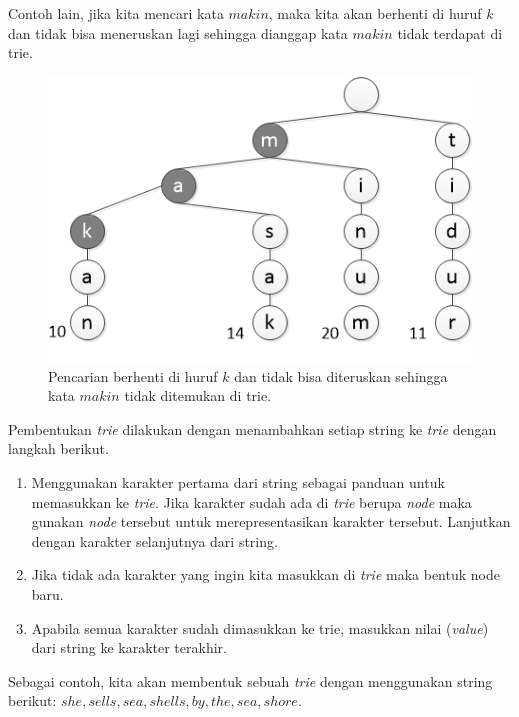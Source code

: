 Contoh lain, jika kita mencari kata $makin$, maka kita akan berhenti di huruf $k$ dan tidak bisa meneruskan lagi sehingga dianggap kata $makin$ tidak terdapat di trie.

\begin{figure}
    \includegraphics[width=\textwidth,keepaspectratio]{fig/TrieSearchingMakin.png}%
	\caption{Pencarian berhenti di huruf $k$ dan tidak bisa diteruskan sehingga kata $makin$ tidak ditemukan di trie.}%
	\label{fig:TrieSearchingMakin}%
\end{figure}

Pembentukan \textit{trie} dilakukan dengan menambahkan setiap string ke \textit{trie} dengan langkah berikut.
\begin{enumerate}
	\item Menggunakan karakter pertama dari string sebagai panduan untuk memasukkan ke \textit{trie}. Jika karakter sudah ada di \textit{trie} berupa \textit{node} maka gunakan \textit{node} tersebut untuk merepresentasikan karakter tersebut. Lanjutkan dengan karakter selanjutnya dari string.
	\item Jika tidak ada karakter yang ingin kita masukkan di \textit{trie} maka bentuk node baru.
	\item Apabila semua karakter sudah dimasukkan ke trie, masukkan nilai (\textit{value}) dari string ke karakter terakhir.
\end{enumerate}

Sebagai contoh, kita akan membentuk sebuah \textit{trie} dengan menggunakan string berikut: $she, sells, sea, shells, by, the, sea, shore$.

